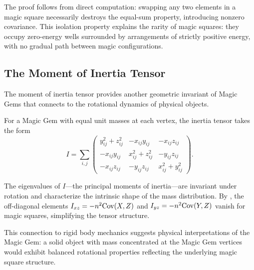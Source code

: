 The proof follows from direct computation: swapping any two elements in a magic square 
necessarily destroys the equal-sum property, introducing nonzero covariance.
This isolation property explains the rarity of magic squares:
they occupy zero-energy wells surrounded by arrangements of strictly positive energy,
with no gradual path between magic configurations.

\subsection{The Moment of Inertia Tensor}
\label{sec:inertia}

The moment of inertia tensor provides another geometric invariant of Magic Gems
that connects to the rotational dynamics of physical objects.

For a Magic Gem with equal unit masses at each vertex, the inertia tensor takes the form
\[
I = \sum_{i,j} \begin{pmatrix}
y_{ij}^2 + z_{ij}^2 & -x_{ij}y_{ij} & -x_{ij}z_{ij} \\
-x_{ij}y_{ij} & x_{ij}^2 + z_{ij}^2 & -y_{ij}z_{ij} \\
-x_{ij}z_{ij} & -y_{ij}z_{ij} & x_{ij}^2 + y_{ij}^2
\end{pmatrix}.
\]

The eigenvalues of $I$---the principal moments of inertia---are invariant under rotation
and characterize the intrinsic shape of the mass distribution.
By , the off-diagonal elements $I_{xz} = -n^2 \mathrm{Cov}(X,Z)$ and $I_{yz} = -n^2 \mathrm{Cov}(Y,Z)$ 
vanish for magic squares, simplifying the tensor structure.

This connection to rigid body mechanics suggests physical interpretations of the Magic Gem:
a solid object with mass concentrated at the Magic Gem vertices would exhibit balanced rotational properties
reflecting the underlying magic square structure.
